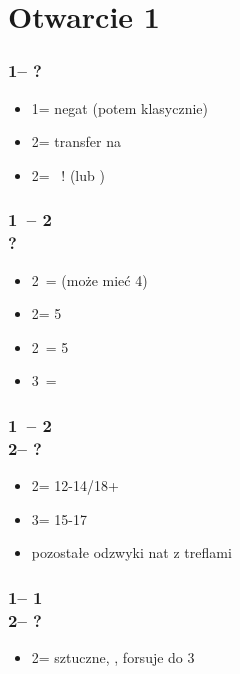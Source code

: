 \documentclass[12pt, a4paper]{report}
\begin{document}
\section*{\colorbox{blue!30}{Otwarcie 1\clubs}}
 {

    \subsubsection*{1\clubs -- ?}
    \begin{itemize}
        \item 1\diams = negat (potem klasycznie)
        \item 2\spades = transfer na \nt
        \item 2\clubs = \gf\ \bal! (lub \clubs)
    \end{itemize}

    \subsubsection*{1\clubs\ -- {2\clubs} \\ ?}
    \begin{itemize}
        \item 2\diams\ = \bal (może mieć 4\major)
        \item 2\major = 5\major
        \item 2\nt\ = 5\diams
        \item 3\clubs\ = \clubs
    \end{itemize}

    \subsubsection*{1\clubs\ -- 2\clubs \\
                2\diams -- ?}
    \begin{itemize}
        \item 2\nt = 12-14/18+ \bal
        \item 3\nt = 15-17 \bal
        \item pozostałe odzwyki nat z treflami
    \end{itemize}

    \subsubsection*{1\clubs -- 1\major \\ 2\clubs -- ?}
    \begin{itemize}
        \item 2\diams = sztuczne, \invp, forsuje do 3\clubs 
    \end{itemize}

}
\end{document}
